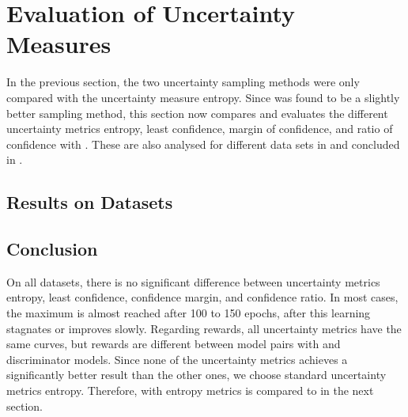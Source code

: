 \section{Evaluation of Uncertainty Measures}
\label{ch:evaluation:sec:evaluation_metrics}
%
In the previous section, the two uncertainty sampling methods were only compared with the uncertainty measure entropy.
Since \ussoftmax was found to be a slightly better sampling method, this section now compares and evaluates the different uncertainty metrics entropy, least confidence, margin of confidence, and ratio of confidence with \ussoftmax. 
These are also analysed for different data sets in  and concluded in .
%
\subsection{Results on Datasets} \label{subsec:measures_results}




%
\subsection{Conclusion}
\label{subsec:measure_conclusion}
On all datasets, there is no significant difference between uncertainty metrics entropy, least confidence, confidence margin, and confidence ratio.
In most cases, the maximum is almost reached after 100 to 150 epochs, after this learning stagnates or improves slowly.
Regarding rewards, all uncertainty metrics have the same curves, but rewards are different between model pairs with \transe and \transe discriminator models.
Since none of the uncertainty metrics achieves a significantly better result than the other ones, we choose standard uncertainty metrics entropy.
Therefore, \ussoftmax with entropy metrics is compared to \origsampling in the next section.